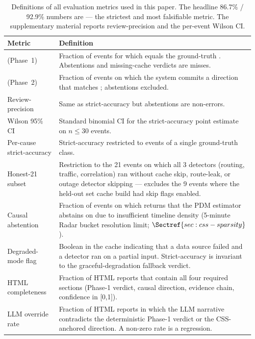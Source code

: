 \begin{table}[t]
\centering
\setlength{\tabcolsep}{4pt}
\renewcommand{\arraystretch}{1.05}
\small
\begin{tabular}{p{}p{}}
\hline
\textbf{Metric} & \textbf{Definition} \\ \hline
\strict{} (Phase~1) & Fraction of events for which
 equals the ground-truth .
Abstentions and missing-cache verdicts are misses. \\
\strict{} (Phase~2) & Fraction of events on which
the system commits a direction that matches
; abstentions excluded. \\
Review-precision & Same as strict-accuracy but abstentions
are non-errors. \\
Wilson 95\% CI & Standard binomial CI for the
strict-accuracy point estimate on $n \leq 30$ events. \\
Per-cause strict-accuracy & Strict-accuracy restricted to
events of a single ground-truth class. \\
Honest-21 subset & Restriction to the 21 events on which
all 3 detectors (routing, traffic, correlation) ran
without cache skip, route-leak, or outage detector
skipping --- excludes the 9 events where the held-out set cache
build had skip flags enabled. \\
Causal abstention & Fraction of events on which
\css{} returns that the PDM estimator abstains on due to
insufficient timeline density (5-minute Radar bucket
resolution limit; $\Sectref{sec:css-sparsity}$). \\
Degraded-mode flag & Boolean in the cache indicating
that a data source failed and a detector ran on a
partial input. Strict-accuracy is invariant to the
graceful-degradation fallback verdict. \\
HTML completeness & Fraction of HTML reports that
contain all four required sections (Phase-1
verdict, causal direction, evidence chain, confidence in [0,1]). \\
LLM override rate & Fraction of HTML reports in which
the LLM narrative contradicts the deterministic
Phase-1 verdict or the CSS-anchored direction.
A non-zero rate is a regression. \\
\hline
\end{tabular}
\caption{Definitions of all evaluation metrics used in
this paper. The headline 86.7\% / 92.9\% numbers are
\strict{} --- the strictest and most falsifiable
metric. The supplementary material reports
review-precision and the per-event Wilson CI.}
\label{tab:metrics}
\end{table}

